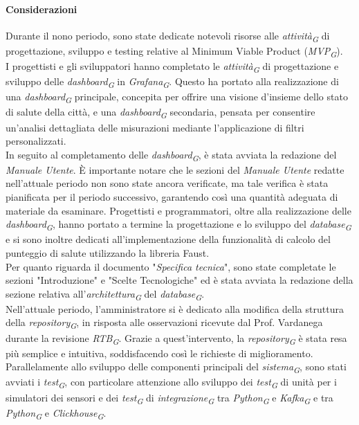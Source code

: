 \paragraph{Considerazioni}
Durante il nono periodo, sono state dedicate notevoli risorse alle \textit{attività}\textsubscript{\textit{G}} di progettazione, sviluppo e testing relative al Minimum Viable Product (\textit{MVP}\textsubscript{\textit{G}}). \\
I progettisti e gli sviluppatori hanno completato le \textit{attività}\textsubscript{\textit{G}} di progettazione e sviluppo delle \textit{dashboard}\textsubscript{\textit{G}} in \textit{Grafana}\textsubscript{\textit{G}}. Questo ha portato alla realizzazione di una \textit{dashboard}\textsubscript{\textit{G}} principale, concepita per offrire una visione d'insieme dello stato di salute della città, e una \textit{dashboard}\textsubscript{\textit{G}} secondaria, pensata per consentire un'analisi dettagliata delle misurazioni mediante l'applicazione di filtri personalizzati. \\
In seguito al completamento delle \textit{dashboard}\textsubscript{\textit{G}}, è stata avviata la redazione del \textit{Manuale Utente}. È importante notare che le sezioni del \textit{Manuale Utente} redatte nell'attuale periodo non sono state ancora verificate, ma tale verifica è stata pianificata per il periodo successivo, garantendo così una quantità adeguata di materiale da esaminare.
Progettisti e programmatori, oltre alla realizzazione delle \textit{dashboard}\textsubscript{\textit{G}}, hanno portato a termine la progettazione e lo sviluppo del \textit{database}\textsubscript{\textit{G}} e si sono inoltre dedicati all'implementazione della funzionalità di calcolo del punteggio di salute utilizzando la libreria Faust. \\
Per quanto riguarda il documento "\textit{Specifica tecnica}", sono state completate le sezioni "Introduzione" e "Scelte Tecnologiche" ed è stata avviata la redazione della sezione relativa all'\textit{architettura}\textsubscript{\textit{G}} del \textit{database}\textsubscript{\textit{G}}. \\
Nell'attuale periodo, l'amministratore si è dedicato alla modifica della struttura della \textit{repository}\textsubscript{\textit{G}}, in risposta alle osservazioni ricevute dal Prof. Vardanega durante la revisione \textit{RTB}\textsubscript{\textit{G}}. Grazie a quest'intervento, la \textit{repository}\textsubscript{\textit{G}} è stata resa più semplice e intuitiva, soddisfacendo così le richieste di miglioramento. \\
Parallelamente allo sviluppo delle componenti principali del \textit{sistema}\textsubscript{\textit{G}}, sono stati avviati i \textit{test}\textsubscript{\textit{G}}, con particolare attenzione allo sviluppo dei \textit{test}\textsubscript{\textit{G}} di unità per i simulatori dei sensori e dei \textit{test}\textsubscript{\textit{G}} di \textit{integrazione}\textsubscript{\textit{G}} tra \textit{Python}\textsubscript{\textit{G}} e \textit{Kafka}\textsubscript{\textit{G}} e tra \textit{Python}\textsubscript{\textit{G}} e \textit{Clickhouse}\textsubscript{\textit{G}}.

